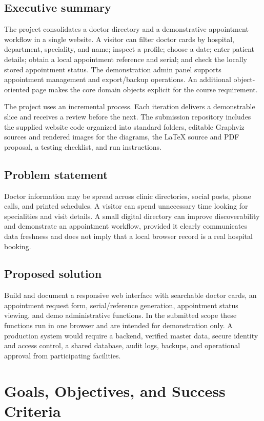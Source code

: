 \documentclass[11pt,a4paper]{article}
\begin{document}
\subsection{Executive summary}
The project consolidates a doctor directory and a demonstrative appointment workflow in a single website. A visitor can filter doctor cards by hospital, department, speciality, and name; inspect a profile; choose a date; enter patient details; obtain a local appointment reference and serial; and check the locally stored appointment status. The demonstration admin panel supports appointment management and export/backup operations. An additional object-oriented page makes the core domain objects explicit for the course requirement.

The project uses an incremental process. Each iteration delivers a demonstrable slice and receives a review before the next. The submission repository includes the supplied website code organized into standard folders, editable Graphviz sources and rendered images for the diagrams, the LaTeX source and PDF proposal, a testing checklist, and run instructions.

\subsection{Problem statement}
Doctor information may be spread across clinic directories, social posts, phone calls, and printed schedules. A visitor can spend unnecessary time looking for specialities and visit details. A small digital directory can improve discoverability and demonstrate an appointment workflow, provided it clearly communicates data freshness and does not imply that a local browser record is a real hospital booking.

\subsection{Proposed solution}
Build and document a responsive web interface with searchable doctor cards, an appointment request form, serial/reference generation, appointment status viewing, and demo administrative functions. In the submitted scope these functions run in one browser and are intended for demonstration only. A production system would require a backend, verified master data, secure identity and access control, a shared database, audit logs, backups, and operational approval from participating facilities.

\section{Goals, Objectives, and Success Criteria}
\end{document}
